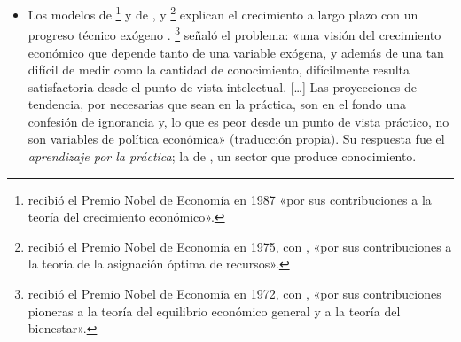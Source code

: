 \documentclass[11pt]{article}
\begin{document}
\begin{itemize}
\begin{itemize}
\begin{itemize}
{\begin{itemize}
\item {} (1776) vio en la \emph{división del trabajo} la fuente de las ganancias de productividad;
\item {} (1817), en el \emph{comercio internacional} la forma de escapar de los rendimientos decrecientes de la tierra;
\item {} (1798), en la presión de la población sobre los recursos el freno de la renta por habitante.
\end{itemize}}. \textcite{Young1928Increasing} recuperó los rendimientos crecientes de la especialización; \textcite{Knight1944Diminishing} sostuvo que la inversión no tiene por qué rendir cada vez menos si el capital incluye el conocimiento, y \textcite[p.~83]{Schumpeter1942} describió la innovación como un proceso que revoluciona la estructura económica «desde dentro», la .
  \item Los modelos de \textcite{Solow1956}\footnote{ recibió el Premio Nobel de Economía en 1987 «por sus contribuciones a la teoría del crecimiento económico»\nocite{NobelPrize1987Solow}.} y de ,  y \footnote{ recibió el Premio Nobel de Economía en 1975, con , «por sus contribuciones a la teoría de la asignación óptima de recursos»\nocite{NobelPrize1975Koopmans}.} explican el crecimiento a largo plazo con un progreso técnico exógeno . \textcite[p.~155]{Arrow1962Learning}\footnote{ recibió el Premio Nobel de Economía en 1972, con , «por sus contribuciones pioneras a la teoría del equilibrio económico general y a la teoría del bienestar»\nocite{Nobel1972HicksArrow}.} señaló el problema: «una visión del crecimiento económico que depende tanto de una variable exógena, y además de una tan difícil de medir como la cantidad de conocimiento, difícilmente resulta satisfactoria desde el punto de vista intelectual. [\ldots] Las proyecciones de tendencia, por necesarias que sean en la práctica, son en el fondo una confesión de ignorancia y, lo que es peor desde un punto de vista práctico, no son variables de política económica» (traducción propia). Su respuesta fue el \emph{aprendizaje por la práctica}; la de \textcite{Uzawa1965}, un sector que produce conocimiento.

\end{itemize}
\end{itemize}
\end{itemize}
\end{document}
